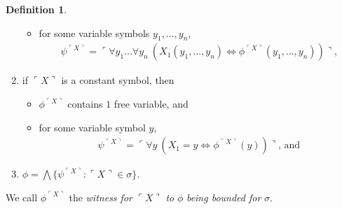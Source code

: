 \documentclass[12pt, twoside]{memoir}
\numberwithin{equation}{section}
\theoremstyle{definition}
\newtheorem{defi}[thm]{Definition}
\theoremstyle{remark}
\theoremstyle{definition}
\theoremstyle{definition}
\theoremstyle{definition}
\theoremstyle{remark}
\begin{document}
\begin{defi}
\begin{enumerate}[label=(\alph*)]
\begin{itemize}[label=$\circ$, leftmargin=20pt]
        \item for some variable symbols $y_1, \dots, y_n$,
        \begin{align*}
            \psi^{\ulcorner X \urcorner} = \ulcorner \forall y_1 \dots \forall y_n \ (X_1(y_1, \dots, y_n) \iff \phi^{\ulcorner X \urcorner}(y_1, \dots, y_n)) \urcorner \text{,}
        \end{align*}
    \end{itemize}
    \item\label{82165} if $\ulcorner X \urcorner$ is a constant symbol, then 
    \begin{itemize}[label=$\circ$, leftmargin=20pt]
        \item $\phi^{\ulcorner X \urcorner}$ contains $1$ free variable, and
        \item for some variable symbol $y$,
        \begin{align*}
            \psi^{\ulcorner X \urcorner} = \ulcorner \forall y \ (X_1 = y \iff \phi^{\ulcorner X \urcorner}(y)) \urcorner \text{, and}
        \end{align*}
    \end{itemize}
    \item $\phi = \bigwedge \{\psi^{\ulcorner X \urcorner} : \ulcorner X \urcorner \in \sigma\}$.
\end{enumerate}
We call $\phi^{\ulcorner X \urcorner}$ the \emph{witness for} $\ulcorner X \urcorner$ \emph{to} $\phi$ \emph{being bounded for} $\sigma$.
\end{defi}
\end{document}
